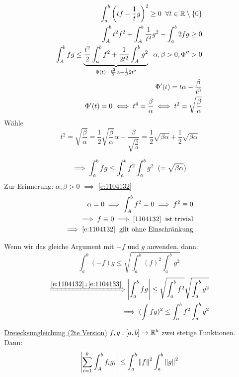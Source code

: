 \begin{Bew}
\begin{Lem}
  \end{Lem}
  \begin{Bew}
    \begin{align*}
      \int_a^b\left( tf-\frac{1}{t}g \right)^2\geq 0\hspace{2mm}\forall t\in\mathbb{R}\setminus\left\{ 0 \right\}\\
      \int_A^bt^2f^2+\int_A^b\frac{1}{t^2}g^2-\int_a^b2fg\geq 0\\
      \int_A^bfg\leq\underbrace{\frac{t^2}{2}\int_a^bf^2+\frac{1}{2t^2}\int_A^bg^2}_{\Phi(t)=\frac{t^2}{2}\alpha+\frac[{\beta}{2t^2}}\hspace{2mm} \alpha,\beta >0, \Phi''>0\\
      \Phi'(t)=t\alpha-\frac{\beta}{t^3}\\
      \Phi'(t)=0\iff t^4=\frac{\beta}{\alpha}\iff t^2=\sqrt{\frac{\beta}{\alpha}}\\
    \end{align*}
    Wähle
    \[t^2=\sqrt{\frac{\beta}{\alpha}}=\frac{1}{2}\sqrt{\frac{\beta}{\alpha}}\alpha+\frac{\beta}{\sqrt{\frac{\beta}{\alpha}}}=\frac{1}{2}\sqrt{\beta\alpha}+\frac{1}{2}\sqrt{\beta\alpha}\]
  \end{Bew}
  \begin{equation}
    \label{e:1104132}
    \implies \int_a^bfg\leq\int_a^bf^2\int_a^bg^2 \hspace{2mm}(=\sqrt{\beta\alpha})
  \end{equation}
  Zur Erinnerung: $\alpha,\beta>0$ $\implies$ \ref{e:1104132}
  \begin{eqnarray*}
    \alpha=0\implies \int_A^bf^2=0\implies f^2\equiv 0\\
    \implies f\equiv 0\implies \ref{1104132}\hspace{2mm}\text{ist trivial}\\
    \implies \ref{e:1104132}\hspace{2mm}\text{gilt ohne Einschränkung}
  \end{eqnarray*}
\end{Bew}
\begin{Kor}
  Wenn wir das gleiche Argument mit $-f$ und $g$ anwenden, dann:
  \begin{equation}
    \label{e:1104133}
    \int_a^b(-f)g\leq\sqrt{\int_a^b(f)^2\int_a^bg^2}
  \end{equation}
  \begin{eqnarray*}
    \xRightarrow{\ref{e:1104132} + \ref{e:1104133}}\left| \int_a^bfg \right|\leq\sqrt{\int_a^bf^2}\sqrt{\int_a^bg^2}\\
    \implies(\int fg)^2\leq \int_a^bf^2\int_a^bg^2
  \end{eqnarray*}
\end{Kor}
\begin{Lem}
  \ul{Dreiecksungleichung (2te Version)} $f,g:[a,b]\rightarrow\mathbb{R}^k$ zwei stetige Funktionen. Dann:
  \[\left| \sum_{i=1}^k\int_A^bf_ig_i \right|\leq\int_a^b\left\| f \right\|^2\int_a^b\left\| g \right\|^2\]
\end{Lem}
